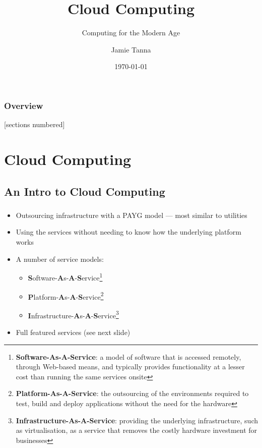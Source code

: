 \documentclass[10pt]{beamer}
\title{Cloud Computing}
\subtitle{Computing for the Modern Age}
\date{\today}
\author{Jamie Tanna}
\makeatletter
\newcommand*{\currentname}{\@currentlabelname}
\newcommand*{\footnotedef}[2]{#1\footnote{\textbf{#1}: #2}}
\makeatother
\begin{document}
\maketitle

\begin{frame}
	\frametitle{Overview}
	[sections numbered]
	\tableofcontents
\end{frame}

\section{Cloud Computing}

\subsection{An Intro to Cloud Computing}
\begin{frame}
	\frametitle{\currentname}

	\begin{itemize}
		\item Outsourcing infrastructure with a PAYG model --- most similar to utilities
		\item Using the services without needing to know how the underlying platform works
		\item A number of service models:
			\begin{itemize}
				\item \footnotedef{\textbf{S}oftware-\textbf{A}s-\textbf{A}-\textbf{S}ervice}{a model of software that is accessed remotely, through Web-based means, and typically provides functionality at a lesser cost than running the same services onsite}
				\item \footnotedef{\textbf{P}latform-\textbf{A}s-\textbf{A}-\textbf{S}ervice}{the outsourcing of the environments required to test, build and deploy applications without the need for the hardware}
				\item \footnotedef{\textbf{I}nfrastructure-\textbf{A}s-\textbf{A}-\textbf{S}ervice}{providing the underlying infrastructure, such as virtualisation, as a service that removes the costly hardware investment for businesses}
			\end{itemize}
		\item Full featured services (see next slide)
	\end{itemize}
\end{frame}
\end{document}
